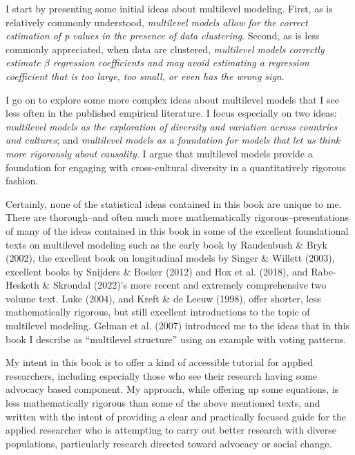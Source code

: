\documentclass[
  letterpaper,
  DIV=11,
  numbers=noendperiod]{scrreprt}
\begin{document}
I start by presenting some initial ideas about multilevel modeling.
First, as is relatively commonly understood, \emph{multilevel models
allow for the correct estimation of p values in the presence of data
clustering}.  Second, as is less commonly appreciated,
when data are clustered, \emph{multilevel models correctly estimate
\(\beta\) regression coefficients and may avoid estimating a regression
coefficient that is too large, too small, or even has the wrong sign}.

I go on to explore some more complex ideas about multilevel models that
I see less often in the published empirical literature. I focus
especially on two ideas: \emph{multilevel models as the exploration of
diversity and variation across countries and cultures}; and
\emph{multilevel models as a foundation for models that let us think
more rigorously about causality}. I argue that multilevel models provide
a foundation for engaging with cross-cultural diversity in a
quantitatively rigorous fashion. 

Certainly, none of the statistical ideas contained in this book are
unique to me. There are thorough--and often much more mathematically
rigorous--presentations of many of the ideas contained in this book in
some of the excellent foundational texts on multilevel modeling such as
the early book by Raudenbush \& Bryk (2002), the excellent book on
longitudinal models by Singer \& Willett (2003), excellent books by
Snijders \& Bosker (2012) and Hox et al. (2018), and Rabe-Hesketh \&
Skrondal (2022)'s more recent and extremely comprehensive two volume
text. Luke (2004), and Kreft \& de Leeuw (1998), offer shorter, less
mathematically rigorous, but still excellent introductions to the topic
of multilevel modeling. Gelman et al. (2007) introduced me to the ideas
that in this book I describe as ``multilevel structure'' using an
example with voting patterns.

My intent in this book is to offer a kind of accessible tutorial for
applied researchers, including especially those who see their research
having some advocacy based component. My approach, while offering up
some equations, is less mathematically rigorous than some of the above
mentioned texts, and written with the intent of providing a clear and
practically focused guide for the applied researcher who is attempting
to carry out better research with diverse populations, particularly
research directed toward advocacy or social change.
\end{document}
